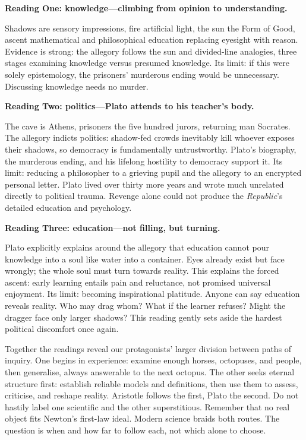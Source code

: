 \textbf{Reading One: knowledge---climbing from opinion to understanding.}

Shadows are sensory impressions, fire artificial light, the sun the Form of Good, ascent mathematical and philosophical education replacing eyesight with reason. Evidence is strong: the allegory follows the sun and divided-line analogies, three stages examining knowledge versus presumed knowledge. Its limit: if this were solely epistemology, the prisoners' murderous ending would be unnecessary. Discussing knowledge needs no murder.

\textbf{Reading Two: politics---Plato attends to his teacher's body.}

The cave is Athens, prisoners the five hundred jurors, returning man Socrates. The allegory indicts politics: shadow-fed crowds inevitably kill whoever exposes their shadows, so democracy is fundamentally untrustworthy. Plato's biography, the murderous ending, and his lifelong hostility to democracy support it. Its limit: reducing a philosopher to a grieving pupil and the allegory to an encrypted personal letter. Plato lived over thirty more years and wrote much unrelated directly to political trauma. Revenge alone could not produce the \textit{Republic}'s detailed education and psychology.

\textbf{Reading Three: education---not filling, but turning.}

Plato explicitly explains around the allegory that education cannot pour knowledge into a soul like water into a container. Eyes already exist but face wrongly; the whole soul must turn towards reality. This explains the forced ascent: early learning entails pain and reluctance, not promised universal enjoyment. Its limit: becoming inspirational platitude. Anyone can say education reveals reality. Who may drag whom? What if the learner refuses? Might the dragger face only larger shadows? This reading gently sets aside the hardest political discomfort once again.

Together the readings reveal our protagonists' larger division between paths of inquiry. One begins in experience: examine enough horses, octopuses, and people, then generalise, always answerable to the next octopus. The other seeks eternal structure first: establish reliable models and definitions, then use them to assess, criticise, and reshape reality. Aristotle follows the first, Plato the second. Do not hastily label one scientific and the other superstitious. Remember that no real object fits Newton's first-law ideal. Modern science braids both routes. The question is when and how far to follow each, not which alone to choose.

